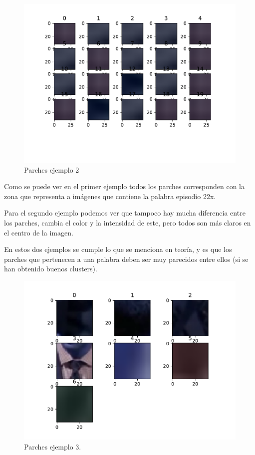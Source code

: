 	\begin{figure}[H]
		\centering
		\includegraphics[scale=0.6]{./imagenes/eje2_2.pdf}
		\caption{Parches ejemplo 2}
		\label{fig:eje2_2}
	\end{figure}

	\vspace{0.06in}
	Como se puede ver en el primer ejemplo todos los parches corresponden con la zona que representa a imágenes que contiene la palabra episodio 22x.
	
	\vspace{0.06in}
	Para el segundo ejemplo podemos ver que tampoco hay mucha diferencia entre los parches, cambia el color y la intensidad de este, pero todos son más claros en el centro de la imagen.
	
	\vspace{0.06in}
	En estos dos ejemplos se cumple lo que se menciona en teoría, y es que los parches que pertenecen a una palabra deben ser muy parecidos entre ellos (si se han obtenido buenos clusters).
	
	\begin{figure}[H]
		\centering
		\includegraphics[scale=0.6]{./imagenes/eje2_3.pdf}
		\caption{Parches ejemplo 3.}
		\label{fig:eje2_3}
	\end{figure}

